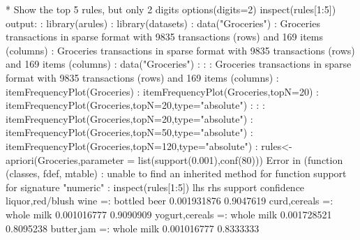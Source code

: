 \documentclass[10pt,a4paper]{article}
\begin{document}
{{* Show the top 5 rules, but only 2 digits
\newline
options(digits=2)
\newline
inspect(rules[1:5])
\newline
output:
\newline
: library(arules)
\newline
: library(datasets)
\newline
: data("Groceries")
\newline
: Groceries
transactions in sparse format with
9835 transactions (rows) and
169 items (columns)
\newline
: Groceries
transactions in sparse format with
9835 transactions (rows) and
169 items (columns)
\newline
: data("Groceries")
\newline
: 
: 
\newline
: Groceries
transactions in sparse format with
9835 transactions (rows) and
169 items (columns)
\newline
: itemFrequencyPlot(Groceries)
\newline
: itemFrequencyPlot(Groceries,topN=20)
\newline
: itemFrequencyPlot(Groceries,topN=20,type="absolute")
\newline
: 
\newline
: 
\newline
: itemFrequencyPlot(Groceries,topN=20,type="absolute")
\newline
: itemFrequencyPlot(Groceries,topN=50,type="absolute")
\newline
: itemFrequencyPlot(Groceries,topN=120,type="absolute")
\newline
: rules<-apriori(Groceries,parameter = list(support(0.001),conf(80)))
Error in (function (classes, fdef, mtable)  : 
unable to find an inherited method for function support for signature "numeric"
\newline
: inspect(rules[1:5])
\newline
lhs                        rhs            support     confidence
 {liquor,red/blush wine} =: {bottled beer} 0.001931876 0.9047619 
 {curd,cereals}          =: {whole milk}   0.001016777 0.9090909 
 {yogurt,cereals}        =: {whole milk}   0.001728521 0.8095238 
 {butter,jam}            =: {whole milk}   0.001016777 0.8333333 
\newline
}}
\end{document}
